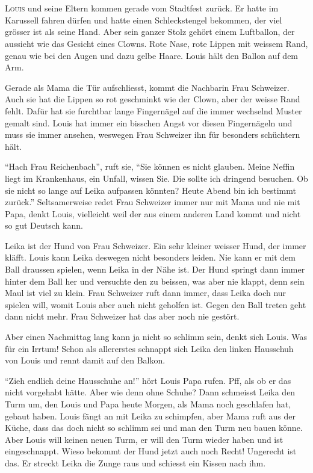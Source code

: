 \chapter*{}
\lettrine[lines=3]{\color{red}L}{ouis} und seine Eltern kommen gerade vom Stadtfest zurück. Er hatte im Karussell fahren dürfen und hatte einen Schleckstengel bekommen, der viel grösser ist als seine Hand. Aber sein ganzer Stolz gehört einem Luftballon, der aussieht wie das Gesicht eines Clowns. Rote Nase, rote Lippen mit weissem Rand, genau wie bei den Augen und dazu gelbe Haare. Louis hält den Ballon auf dem Arm.

Gerade als Mama die Tür aufschliesst, kommt die Nachbarin Frau Schweizer. Auch sie hat die Lippen so rot geschminkt wie der Clown, aber der weisse Rand fehlt. Dafür hat sie furchtbar lange Fingernägel auf die immer wechselnd Muster gemalt sind. Louis hat immer ein bisschen Angst vor diesen Fingernägeln und muss sie immer ansehen, weswegen Frau Schweizer ihn für besonders schüchtern hält.

\enquote{Hach Frau Reichenbach}, ruft sie, \enquote{Sie können es nicht glauben. Meine Neffin liegt im Krankenhaus, ein Unfall, wissen Sie. Die sollte ich dringend besuchen. Ob sie nicht so lange auf Leika aufpassen könnten? Heute Abend bin ich bestimmt zurück.} Seltsamerweise redet Frau Schweizer immer nur mit Mama und nie mit Papa, denkt Louis, vielleicht weil der aus einem anderen Land kommt und nicht so gut Deutsch kann.

Leika ist der Hund von Frau Schweizer. Ein sehr kleiner weisser Hund, der immer kläfft. Louis kann Leika deswegen nicht besonders leiden. Nie kann er mit dem Ball draussen spielen, wenn Leika in der Nähe ist. Der Hund springt dann immer hinter dem Ball her und versuchte den zu beissen, was aber nie klappt, denn sein Maul ist viel zu klein. Frau Schweizer ruft dann immer, dass Leika doch nur spielen will, womit Louis aber auch nicht geholfen ist. Gegen den Ball treten geht dann nicht mehr. Frau Schweizer hat das aber noch nie gestört.

Aber einen Nachmittag lang kann ja nicht so schlimm sein, denkt sich Louis. Was für ein Irrtum! Schon als allererstes schnappt sich Leika den linken Hausschuh von Louis und rennt damit auf den Balkon.

\enquote{Zieh endlich deine Hausschuhe an!} hört Louis Papa rufen. Pff, als ob er das nicht vorgehabt hätte. Aber wie denn ohne Schuhe? Dann schmeisst Leika den Turm um, den Louis und Papa heute Morgen, als Mama noch geschlafen hat, gebaut haben. Louis fängt an mit Leika zu schimpfen, aber Mama ruft aus der Küche, dass das doch nicht so schlimm sei und man den Turm neu bauen könne. Aber Louis will keinen neuen Turm, er will den Turm wieder haben und ist eingeschnappt. Wieso bekommt der Hund jetzt auch noch Recht! Ungerecht ist das. Er streckt Leika die Zunge raus und schiesst ein Kissen nach ihm.

